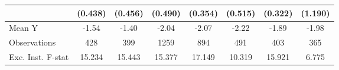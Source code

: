 {\begin{tabular}{l*{7}{c}}
            &     (0.438)         &     (0.456)         &     (0.490)         &     (0.354)         &     (0.515)         &     (0.322)         &     (1.190)         \\
\midrule
Mean Y      &       -1.54         &       -1.40         &       -2.04         &       -2.07         &       -2.22         &       -1.89         &       -1.98         \\
Observations&         428         &         399         &        1259         &         894         &         491         &         403         &         365         \\
Exc. Inst. F-stat&      15.234         &      15.443         &      15.377         &      17.149         &      10.319         &      15.921         &       6.775         \\
\bottomrule
\end{tabular}
}
